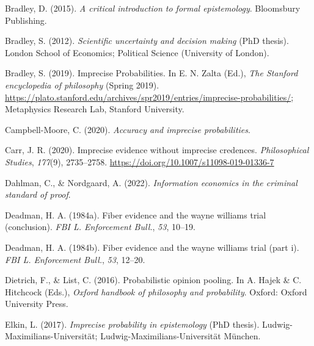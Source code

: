 \documentclass[
  10pt,
  dvipsnames,enabledeprecatedfontcommands]{scrartcl}
\newlength{\cslhangindent}
\newlength{\cslentryspacingunit} %
\newenvironment{CSLReferences}[2] %
 {%
  \setlength{\parindent}{0pt}
  \ifodd #1
  \let\oldpar\par
  \def\par{\hangindent=\cslhangindent\oldpar}
  \fi
  \setlength{\parskip}{#2\cslentryspacingunit}
 }%
 {}
\begin{document}
\hypertarget{refs}{}
\begin{CSLReferences}{1}{0}
\leavevmode{}%
Bradley, D. (2015). \emph{A critical introduction to formal
epistemology}. Bloomsbury Publishing.

\leavevmode{}%
Bradley, S. (2012). \emph{Scientific uncertainty and decision making}
(PhD thesis). London School of Economics; Political Science (University
of London).

\leavevmode{}%
Bradley, S. (2019). {Imprecise Probabilities}. In E. N. Zalta (Ed.),
\emph{The {Stanford} encyclopedia of philosophy} ({S}pring 2019).
\url{https://plato.stanford.edu/archives/spr2019/entries/imprecise-probabilities/};
Metaphysics Research Lab, Stanford University.

\leavevmode{}%
Campbell-Moore, C. (2020). \emph{Accuracy and imprecise probabilities}.

\leavevmode{}%
Carr, J. R. (2020). Imprecise evidence without imprecise credences.
\emph{Philosophical Studies}, \emph{177}(9), 2735--2758.
\url{https://doi.org/10.1007/s11098-019-01336-7}

\leavevmode{}%
Dahlman, C., \& Nordgaard, A. (2022). \emph{Information economics in the
criminal standard of proof}.

\leavevmode{}%
Deadman, H. A. (1984a). Fiber evidence and the wayne williams trial
(conclusion). \emph{FBI L. Enforcement Bull.}, \emph{53}, 10--19.

\leavevmode{}%
Deadman, H. A. (1984b). Fiber evidence and the wayne williams trial
(part i). \emph{FBI L. Enforcement Bull.}, \emph{53}, 12--20.

\leavevmode{}%
Dietrich, F., \& List, C. (2016). Probabilistic opinion pooling. In A.
Hajek \& C. Hitchcock (Eds.), \emph{Oxford handbook of philosophy and
probability}. Oxford: Oxford University Press.

\leavevmode{}%
Elkin, L. (2017). \emph{Imprecise probability in epistemology} (PhD
thesis). Ludwig-Maximilians-Universit{ä}t;
Ludwig-Maximilians-Universität München.


\end{CSLReferences}
\end{document}
